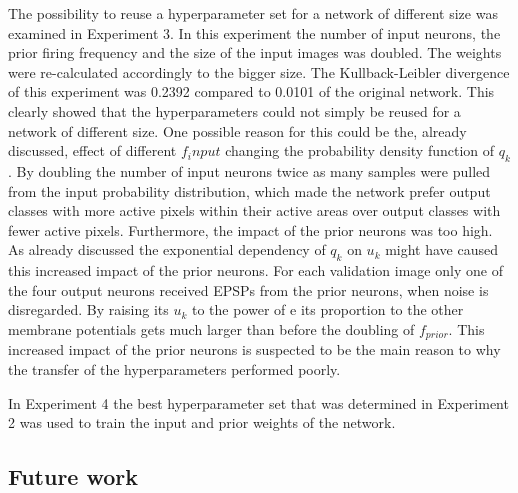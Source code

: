 The possibility to reuse a hyperparameter set for a network of different size was examined in Experiment 3. In this experiment the number of input neurons, the prior firing frequency and the size of the input images was doubled. The weights were re-calculated accordingly to the bigger size. The Kullback-Leibler divergence of this experiment was 0.2392 compared to 0.0101 of the original network. This clearly showed that the hyperparameters could not simply be reused for a network of different size. One possible reason for this could be the, already discussed, effect of different $f_input$ changing the probability density function of $q_k$. By doubling the number of input neurons twice as many samples were pulled from the input probability distribution, which made the network prefer output classes with more active pixels within their active areas over output classes with fewer active pixels. Furthermore, the impact of the prior neurons was too high. As already discussed the exponential dependency of $q_k$ on $u_k$ might have caused this increased impact of the prior neurons. For each validation image only one of the four output neurons received EPSPs from the prior neurons, when noise is disregarded. By raising its $u_k$ to the power of e its proportion to the other membrane potentials gets much larger than before the doubling of $f_{prior}$. This increased impact of the prior neurons is suspected to be the main reason to why the transfer of the hyperparameters performed poorly.

In Experiment 4 the best hyperparameter set that was determined in Experiment 2 was used to train the input and prior weights of the network.

\subsection{Future work}


